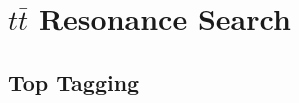 \chapter{$t\bar{t}$ Resonance Search}
\label{chap:analysis}



\clearpage
\section{Top Tagging}
\clearpage

\clearpage

\clearpage

\clearpage


